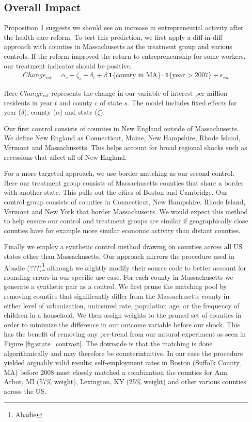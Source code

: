 \documentclass[12pt]{article}
\begin{document}
\subsection{Overall Impact}

Proposition 1 suggests we should see an increase in entrepreneurial activity after the health care reform. To test this prediction, we first apply a diff-in-diff approach with counties in Massachusetts as the treatment group and various controls. If the reform improved the return to entrepreneurship for some workers, our treatment indicator should be positive. 
\begin{align}
Change_{cst} = \alpha_c + \zeta_s + \delta_t + \beta \, \mathbf{1}\{\text{county in MA}\} \cdot \mathbf{1}\{\text{year > 2007}\} + \epsilon_{cst}
\end{align}

Here $Change_{cst}$ represents the change in our variable of interest per million residents in year $t$ and county $c$ of state $s$. The model includes fixed effects for year ($\delta$), county ($\alpha$) and state ($\zeta$).

Our first control consists of counties in New England outside of Massachusetts. We define New England as Connecticut, Maine, New Hampshire, Rhode Island, Vermont and Massachusetts. This helps account for broad regional shocks such as recessions that affect all of New England. 

For a more targeted approach, we use border matching as our second control. Here our treatment group consists of Massachusetts counties that share a border with another state. This pulls out the cities of Boston and Cambridge. Our control group consists of counties in Connecticut, New Hampshire, Rhode Island, Vermont and New York that border Massachusetts. We would expect this method to help ensure our control and treatment groups are similar if geographically close counties  have for example more similar economic activity than distant counties. 

Finally we employ a synthetic control method drawing on counties across all US states other than Massachusetts. Our approach mirrors the procedure used in Abadie (???)\footnote{Abadie} although we slightly modify their source code to better account for rounding errors in our specific use case. For each county in Massachusetts we generate a synthetic pair as a control. We first prune the matching pool by removing counties that significantly differ from the Massachusetts county in either level of urbanization, uninsured rate, population age, or the frequency of children in a household. We then assign weights to the pruned set of counties in order to minimize the difference in our outcome variable before our shock. This has the benefit of removing any pre-trend from our natural experiment as seen in Figure \ref{fig:state_contrast}. The downside is that the matching is done algorithmically and may therefore be counterintuitive. In our case the procedure yielded arguably valid results; self-employment rates in Boston (Suffolk County, MA) before 2008 most closely matched a combination the counties for Ann Arbor, MI (57\% weight), Lexington, KY (25\% weight) and other various counties across the US. 
\end{document}
